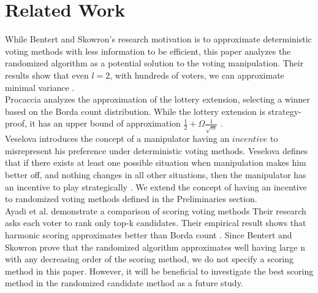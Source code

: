 \documentclass[letterpaper]{article} %
\begin{document}
\section{Related Work}
While Bentert and Skowron's research motivation is to approximate deterministic voting methods with less information to be efficient, this paper analyzes the randomized algorithm as a potential solution to the voting manipulation. Their results show that even $l = 2$, with hundreds of voters, we can approximate minimal variance \cite{Skowron}.\\
Procaccia analyzes the approximation of the lottery extension, selecting a winner based on the Borda count distribution. While the lottery extension is strategy-proof, it has an upper bound of approximation $\frac{1}{2} +\Omega{ \frac{1}{\sqrt{m}} }$  \cite{Procaccia_1}.\\
Veselova introduces the concept of a manipulator having an $incentive$ to misrepresent his preference under deterministic voting methods. Veselova defines that if there exists at least one possible situation when manipulation makes him better off, and nothing changes in all other situations, then the manipulator has an incentive to play strategically \cite{Veselova}. We extend the concept of having an incentive to randomized voting methods defined in the Preliminaries section.\\
Ayadi et al. demonstrate a comparison of scoring voting methods Their research asks each voter to rank only top-k candidates. Their empirical result shows that harmonic scoring approximates better than Borda count \cite{Ayadi}. Since Bentert and Skowron prove that the randomized algorithm approximates well having large n with any decreasing order of the scoring method, we do not specify a scoring method in this paper. However, it will be beneficial to investigate the best scoring method in the randomized candidate method as a future study.

\end{document}
